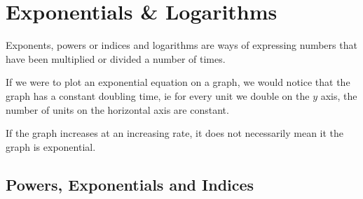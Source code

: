 \chapter{Exponentials \& Logarithms}
\label{chap:ExponentialsAndLogarithms}
Exponents, powers or indices and logarithms are ways of expressing numbers that
have been multiplied or divided a number of times.

If we were to plot an exponential equation on a graph, we would notice that
the graph has a constant doubling time, ie for every unit we double on the
$y$ axis, the number of units on the horizontal axis are constant.

If the graph increases at an increasing rate, it does not necessarily mean it
the graph is exponential.

\section{Powers, Exponentials and Indices}
\label{sec:PowersExponentialsAndIndices}

